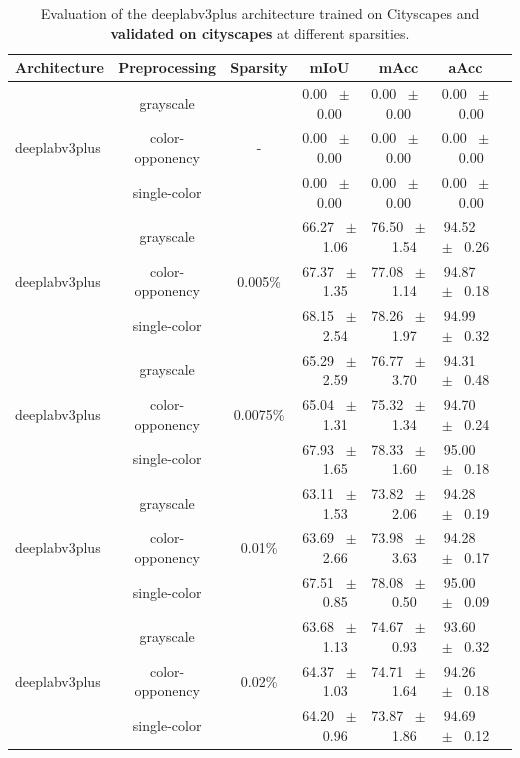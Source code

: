 \begin{table}[h]
  \centering
  \caption{Evaluation of the deeplabv3plus architecture trained on Cityscapes and \textbf{validated on cityscapes} at different sparsities.}
  \begin{tabular}{@{}lccc ccc@{}}
    \toprule
    Architecture & Preprocessing & Sparsity & mIoU & mAcc & aAcc \\
    \midrule
    \midrule
    \midrule
    \multirow{3}{*}{deeplabv3plus} & grayscale & \multirow{3}{*}{-} & 0.00 ~$\pm$~ 0.00 & 0.00 ~$\pm$~ 0.00 & 0.00 ~$\pm$~ 0.00 \\
    & color-opponency & & 0.00 ~$\pm$~ 0.00 & 0.00 ~$\pm$~ 0.00 & 0.00 ~$\pm$~ 0.00 \\
    & single-color & & 0.00 ~$\pm$~ 0.00 & 0.00 ~$\pm$~ 0.00 & 0.00 ~$\pm$~ 0.00 \\
    \midrule
    \multirow{3}{*}{deeplabv3plus} & grayscale & \multirow{3}{*}{0.005\%} & 66.27 ~$\pm$~ 1.06 & 76.50 ~$\pm$~ 1.54 & 94.52 ~$\pm$~ 0.26 \\
    & color-opponency & & 67.37 ~$\pm$~ 1.35 & 77.08 ~$\pm$~ 1.14 & 94.87 ~$\pm$~ 0.18 \\
    & single-color & & 68.15 ~$\pm$~ 2.54 & 78.26 ~$\pm$~ 1.97 & 94.99 ~$\pm$~ 0.32 \\
    \midrule
    \multirow{3}{*}{deeplabv3plus} & grayscale & \multirow{3}{*}{0.0075\%} & 65.29 ~$\pm$~ 2.59 & 76.77 ~$\pm$~ 3.70 & 94.31 ~$\pm$~ 0.48 \\
    & color-opponency & & 65.04 ~$\pm$~ 1.31 & 75.32 ~$\pm$~ 1.34 & 94.70 ~$\pm$~ 0.24 \\
    & single-color & & 67.93 ~$\pm$~ 1.65 & 78.33 ~$\pm$~ 1.60 & 95.00 ~$\pm$~ 0.18 \\
    \midrule
    \multirow{3}{*}{deeplabv3plus} & grayscale & \multirow{3}{*}{0.01\%} & 63.11 ~$\pm$~ 1.53 & 73.82 ~$\pm$~ 2.06 & 94.28 ~$\pm$~ 0.19 \\
    & color-opponency & & 63.69 ~$\pm$~ 2.66 & 73.98 ~$\pm$~ 3.63 & 94.28 ~$\pm$~ 0.17 \\
    & single-color & & 67.51 ~$\pm$~ 0.85 & 78.08 ~$\pm$~ 0.50 & 95.00 ~$\pm$~ 0.09 \\
    \midrule
    \multirow{3}{*}{deeplabv3plus} & grayscale & \multirow{3}{*}{0.02\%} & 63.68 ~$\pm$~ 1.13 & 74.67 ~$\pm$~ 0.93 & 93.60 ~$\pm$~ 0.32 \\
    & color-opponency & & 64.37 ~$\pm$~ 1.03 & 74.71 ~$\pm$~ 1.64 & 94.26 ~$\pm$~ 0.18 \\
    & single-color & & 64.20 ~$\pm$~ 0.96 & 73.87 ~$\pm$~ 1.86 & 94.69 ~$\pm$~ 0.12 \\
    \midrule
    \bottomrule
  \end{tabular}
  \label{tab:sparse_deeplabv3plus_cityscapes}
\end{table}